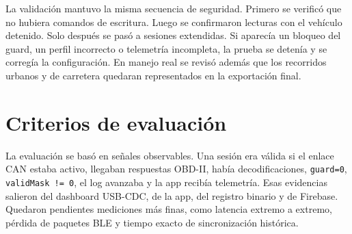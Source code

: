 \documentclass[12pt,letterpaper]{report}
\begin{document}
La validación mantuvo la misma secuencia de seguridad. Primero se verificó que no hubiera comandos de escritura. Luego se confirmaron lecturas con el vehículo detenido. Solo después se pasó a sesiones extendidas. Si aparecía un bloqueo del guard, un perfil incorrecto o telemetría incompleta, la prueba se detenía y se corregía la configuración. En manejo real se revisó además que los recorridos urbanos y de carretera quedaran representados en la exportación final.

\section{Criterios de evaluación}

\label{sec:criterios-evaluacion}

La evaluación se basó en señales observables. Una sesión era válida si el enlace CAN estaba activo, llegaban respuestas OBD-II, había decodificaciones, \texttt{guard=0}, \texttt{validMask != 0}, el log avanzaba y la app recibía telemetría. Esas evidencias salieron del dashboard USB-CDC, de la app, del registro binario y de Firebase. Quedaron pendientes mediciones más finas, como latencia extremo a extremo, pérdida de paquetes BLE y tiempo exacto de sincronización histórica.
\end{document}
